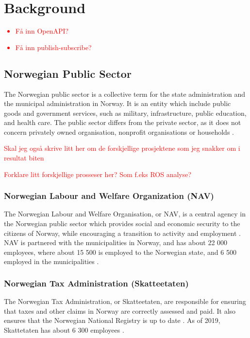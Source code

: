 \chapter{Background}

\textcolor{red}{
\begin{itemize}
    \item Få inn OpenAPI?
    \item Få inn publish-subscribe?
\end{itemize}
}

\section{Norwegian Public Sector}
The Norwegian public sector is a collective term for the state administration and the municipal administration in Norway. It is an entity which include public goods and government services, such as military, infrastructure, public education, and health care. The public sector differs from the private sector, as it does not concern privately owned organisation, nonprofit organisations or households \cite{os_snl_2022}\cite{ps_wiki_2023}.

\textcolor{red}{Skal jeg også skrive litt her om de forskjellige prosjektene som jeg snakker om i resultat biten}

\textcolor{red}{Forklare litt forskjellige prosseser her? Som f.eks ROS analyse?}

\subsection{Norwegian Labour and Welfare Organization (NAV)}
The Norwegian Labour and Welfare Organisation, or NAV, is a central agency in the Norwegian public sector which provides social and economic security to the citizens of Norway, while encouraging a transition to activity and employment \cite{nav_r_2023}. NAV is partnered with the municipalities in Norway, and has about 22 000 employees, where about 15 500 is employed to the Norwegian state, and 6 500 employed in the municipalities \cite{org_nav_2023}. 

\subsection{Norwegian Tax Administration (Skatteetaten)}
The Norwegian Tax Administration, or Skatteetaten, are responsible for ensuring that taxes and other claims in Norway are correctly assessed and paid. It also ensures that the Norwegian National Registry is up to date \cite{skatt_r_2023}. As of 2019, Skattetaten has about 6 300 employees \cite{skatt_r_2023}. 

